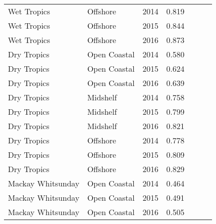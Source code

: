 {\begin{longtable}{llccccc}
  Wet Tropics & Offshore & 2014 & 0.819 & \cellcolor[HTML]{B0D235}{B} & \cellcolor[HTML]{00734D}{A} & \cellcolor[HTML]{B0D235}{B} \\ 
  Wet Tropics & Offshore & 2015 & 0.844 & \cellcolor[HTML]{00734D}{A} & \cellcolor[HTML]{00734D}{A} & \cellcolor[HTML]{B0D235}{B} \\ 
  Wet Tropics & Offshore & 2016 & 0.873 & \cellcolor[HTML]{00734D}{A} & \cellcolor[HTML]{00734D}{A} & \cellcolor[HTML]{00734D}{A} \\ 
  Dry Tropics & Open Coastal & 2014 & 0.580 & \cellcolor[HTML]{F0C918}{C} & \cellcolor[HTML]{F0C918}{C} & \cellcolor[HTML]{F0C918}{C} \\ 
  Dry Tropics & Open Coastal & 2015 & 0.624 & \cellcolor[HTML]{F0C918}{C} & \cellcolor[HTML]{B0D235}{B} & \cellcolor[HTML]{F0C918}{C} \\ 
  Dry Tropics & Open Coastal & 2016 & 0.639 & \cellcolor[HTML]{F0C918}{C} & \cellcolor[HTML]{B0D235}{B} & \cellcolor[HTML]{F0C918}{C} \\ 
  Dry Tropics & Midshelf & 2014 & 0.758 & \cellcolor[HTML]{B0D235}{B} & \cellcolor[HTML]{B0D235}{B} & \cellcolor[HTML]{B0D235}{B} \\ 
  Dry Tropics & Midshelf & 2015 & 0.799 & \cellcolor[HTML]{B0D235}{B} & \cellcolor[HTML]{B0D235}{B} & \cellcolor[HTML]{B0D235}{B} \\ 
  Dry Tropics & Midshelf & 2016 & 0.821 & \cellcolor[HTML]{B0D235}{B} & \cellcolor[HTML]{00734D}{A} & \cellcolor[HTML]{B0D235}{B} \\ 
  Dry Tropics & Offshore & 2014 & 0.778 & \cellcolor[HTML]{B0D235}{B} & \cellcolor[HTML]{B0D235}{B} & \cellcolor[HTML]{B0D235}{B} \\ 
  Dry Tropics & Offshore & 2015 & 0.809 & \cellcolor[HTML]{B0D235}{B} & \cellcolor[HTML]{00734D}{A} & \cellcolor[HTML]{B0D235}{B} \\ 
  Dry Tropics & Offshore & 2016 & 0.829 & \cellcolor[HTML]{B0D235}{B} & \cellcolor[HTML]{00734D}{A} & \cellcolor[HTML]{B0D235}{B} \\ 
  Mackay Whitsunday & Open Coastal & 2014 & 0.464 & \cellcolor[HTML]{F47721}{D} & \cellcolor[HTML]{F0C918}{C} & \cellcolor[HTML]{F47721}{D} \\ 
  Mackay Whitsunday & Open Coastal & 2015 & 0.491 & \cellcolor[HTML]{F47721}{D} & \cellcolor[HTML]{F0C918}{C} & \cellcolor[HTML]{F47721}{D} \\ 
  Mackay Whitsunday & Open Coastal & 2016 & 0.505 & \cellcolor[HTML]{F0C918}{C} & \cellcolor[HTML]{F0C918}{C} & \cellcolor[HTML]{F0C918}{C} \\ 

\end{longtable}}
